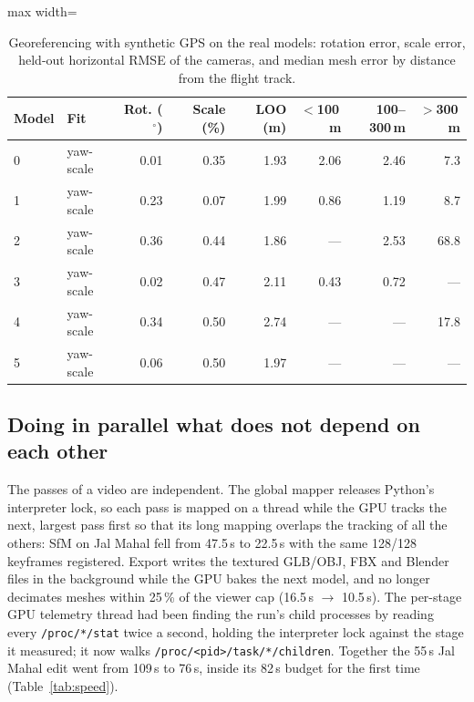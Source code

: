 \begin{table}[htbp]
\centering\small
\caption{Georeferencing with synthetic GPS on the real models: rotation error, scale error, held-out horizontal RMSE of the cameras, and median mesh error by distance from the flight track.}\label{tab:geoe2e}
\begin{adjustbox}{max width=\linewidth}
\begin{tabular}{llrrrrrr}
\toprule
Model & Fit & Rot. ($^\circ$) & Scale (\%) & LOO (m) & $<$100\,m & 100--300\,m & $>$300\,m \\
\midrule
0 & yaw-scale & 0.01 & 0.35 & 1.93 & 2.06 & 2.46 & 7.3 \\
1 & yaw-scale & 0.23 & 0.07 & 1.99 & 0.86 & 1.19 & 8.7 \\
2 & yaw-scale & 0.36 & 0.44 & 1.86 & --- & 2.53 & 68.8 \\
3 & yaw-scale & 0.02 & 0.47 & 2.11 & 0.43 & 0.72 & --- \\
4 & yaw-scale & 0.34 & 0.50 & 2.74 & --- & --- & 17.8 \\
5 & yaw-scale & 0.06 & 0.50 & 1.97 & --- & --- & --- \\
\bottomrule
\end{tabular}
\end{adjustbox}
\end{table}

\subsection{Doing in parallel what does not depend on each other}\label{sec:speed}
The passes of a video are independent. The global mapper releases Python's interpreter lock, so each pass is mapped on a thread while the GPU tracks the next, largest pass first so that its long mapping overlaps the tracking of all the others: SfM on Jal Mahal fell from 47.5\,s to 22.5\,s with the same 128/128 keyframes registered. Export writes the textured GLB/OBJ, FBX and Blender files in the background while the GPU bakes the next model, and no longer decimates meshes within 25\,\% of the viewer cap (16.5\,s $\to$ 10.5\,s). The per-stage GPU telemetry thread had been finding the run's child processes by reading every \texttt{/proc/*/stat} twice a second, holding the interpreter lock against the stage it measured; it now walks \texttt{/proc/<pid>/task/*/children}. Together the 55\,s Jal Mahal edit went from 109\,s to 76\,s, inside its 82\,s budget for the first time (Table~\ref{tab:speed}).

